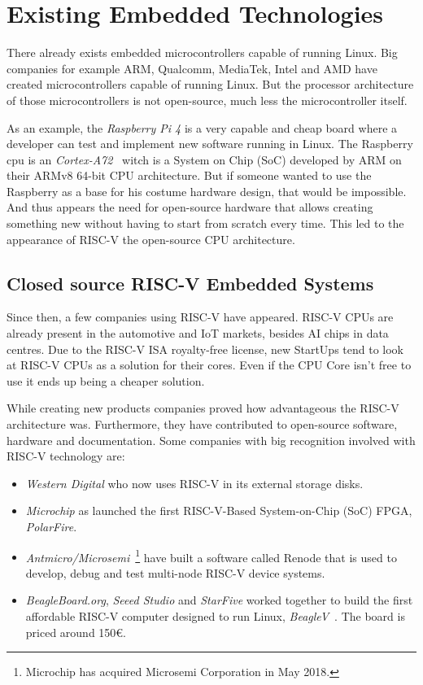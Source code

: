 \chapter{Existing Embedded Technologies}
\label{chapter:existing_embedded_technologies}
There already exists embedded microcontrollers capable of running Linux. Big companies for example ARM, Qualcomm, MediaTek, Intel and AMD have created microcontrollers capable of running Linux. But the processor architecture of those microcontrollers is not open-source, much less the microcontroller itself.

As an example, the \textit{Raspberry Pi 4} is a very capable and cheap board where a developer can test and implement new software running in Linux. The Raspberry \acrshort{cpu} is an \textit{Cortex-A72}~\cite{cortex_a72} witch is a System on Chip (SoC) developed by ARM on their ARMv8 64-bit CPU architecture. But if someone wanted to use the Raspberry as a base for his costume hardware design, that would be impossible. And thus appears the need for open-source hardware that allows creating something new without having to start from scratch every time. This led to the appearance of RISC-V the open-source CPU architecture.


\section{Closed source RISC-V Embedded Systems}
\label{section:closed_source}
Since then, a few companies using RISC-V have appeared. RISC-V CPUs are already present in the automotive and IoT markets, besides AI chips in data centres. Due to the RISC-V ISA royalty-free license, new StartUps tend to look at RISC-V CPUs as a solution for their cores. Even if the CPU Core isn't free to use it ends up being a cheaper solution.

While creating new products companies proved how advantageous the RISC-V architecture was. Furthermore, they have contributed to open-source software, hardware and documentation. Some companies with big recognition involved with RISC-V technology are:
\begin{itemize}
    \item \textit{Western Digital} who now uses RISC-V in its external storage disks.
    \item \textit{Microchip} as launched the first RISC-V-Based System-on-Chip (SoC) FPGA, \textit{PolarFire}.
    \item \textit{Antmicro/Microsemi}~\footnote{Microchip has acquired Microsemi Corporation in May 2018.} have built a software called Renode that is used to develop, debug and test multi-node RISC-V device systems.
    \item \textit{BeagleBoard.org}, \textit{Seeed Studio} and \textit{StarFive} worked together to build the first affordable RISC-V computer designed to run Linux, \textit{BeagleV}~\cite{beagleV}. The board is priced around 150€.
\end{itemize}

